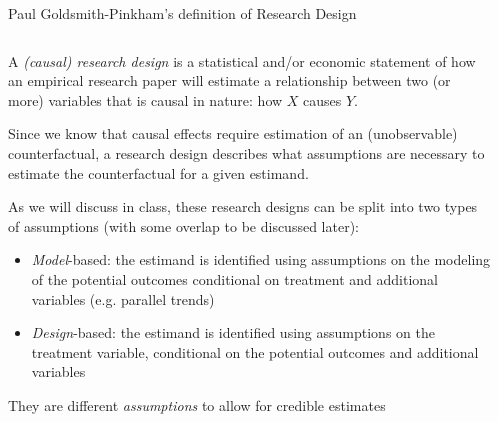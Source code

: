 \documentclass[notes,11pt, aspectratio=169]{beamer}
\newenvironment{wideitemize}{\itemize\addtolength{\itemsep}{10pt}}{\enditemize}
\begin{document}
\begin{frame}{Paul Goldsmith-Pinkham's definition of Research Design}
\begin{columns}[T] %
  \begin{column}{\textwidth}
    \begin{wideitemize}
    \item A \emph{(causal) research design} is a statistical and/or economic
      statement of how an empirical research paper will estimate a
      relationship between two (or more) variables that is causal in nature: how $X$ causes $Y$.

    \item Since we know that causal effects require estimation of an
      (unobservable) counterfactual, a research design describes what
      assumptions are necessary to estimate the counterfactual for a
      given estimand.
      
    \item As we will discuss in class, these research designs can be
      split into two types of assumptions (with some overlap to be
      discussed later):
      \begin{itemize}
      \item \emph{Model}-based: the estimand is
        identified using assumptions on the modeling of the potential outcomes conditional on treatment and additional variables
         (e.g. parallel trends)
       \item\emph{Design}-based: the estimand is
         identified using assumptions on the treatment variable,
         conditional on the potential outcomes and additional
         variables
      \end{itemize}

      \item They are different \emph{assumptions} to allow for credible estimates
    \end{wideitemize}
\end{column}%
\hfill%
\begin{column}{.6\textwidth}
\end{column}%
\end{columns}
\end{frame}
\end{document}
